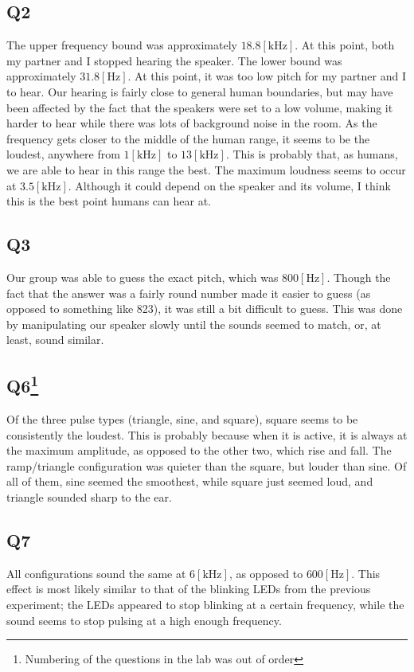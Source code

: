 \documentclass[
	letterpaper, %
	10pt, %
]{CSUniSchoolLabReport}
\begin{document}
\subsection{Q2} The upper frequency bound was approximately $18.8[\si{\kilo\hertz}]$. At this point, both my partner and I stopped hearing the speaker. The lower bound was approximately $31.8[\si{\hertz}]$. At this point, it was too low pitch for my partner and I to hear. Our hearing is fairly close to general human boundaries, but may have been affected by the fact that the speakers were set to a low volume, making it harder to hear while there was lots of background noise in the room. As the frequency gets closer to the middle of the human range, it seems to be the loudest, anywhere from $1[\si{\kilo\hertz}]$ to $13[\si{\kilo\hertz}]$. This is probably that, as humans, we are able to hear in this range the best. The maximum loudness seems to occur at $3.5[\si{\kilo\hertz}]$. Although it could depend on the speaker and its volume, I think this is the best point humans can hear at.

\subsection{Q3} Our group was able to guess the exact pitch, which was $800[\si{\hertz}]$. Though the fact that the answer was a fairly round number made it easier to guess (as opposed to something like 823), it was still a bit difficult to guess. This was done by manipulating our speaker slowly until the sounds seemed to match, or, at least, sound similar.

\subsection{Q6\footnote{Numbering of the questions in the lab was out of order}} Of the three pulse types (triangle, sine, and square), square seems to be consistently the loudest. This is probably because when it is active, it is always at the maximum amplitude, as opposed to the other two, which rise and fall. The ramp/triangle configuration was quieter than the square, but louder than sine. Of all of them, sine seemed the smoothest, while square just seemed loud, and triangle sounded sharp to the ear.

\subsection{Q7} All configurations sound the same at $6[\si{\kilo\hertz}]$, as opposed to $600[\si{\hertz}]$. This effect is most likely similar to that of the blinking LEDs from the previous experiment; the LEDs appeared to stop blinking at a certain frequency, while the sound seems to stop pulsing at a high enough frequency.
\end{document}
